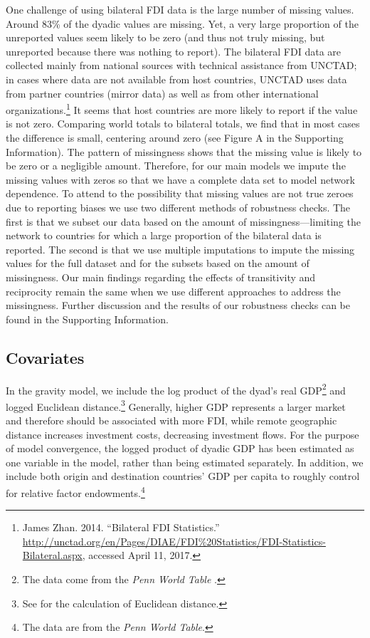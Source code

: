 \documentclass[reqno,onecolumn,letterpaper,12pt]{article}
\begin{document}
One challenge of using bilateral FDI data is the large number of missing values. %
Around 83\% of the dyadic values are missing. %
Yet, a very large proportion of the unreported values seem likely to be zero (and thus not truly missing, but unreported because there was nothing to report). The bilateral FDI data are collected mainly from national sources with technical assistance from UNCTAD; in cases where data are not available from host countries, UNCTAD uses data from partner countries (mirror data) as well as from other international organizations.\footnote{James Zhan. 2014. ``Bilateral FDI Statistics.'' \url{http://unctad.org/en/Pages/DIAE/FDI\%20Statistics/FDI-Statistics-Bilateral.aspx}, accessed April 11, 2017.}
It seems that host countries are more likely to report if the value is not zero. Comparing world totals to bilateral totals, we find that in most cases the difference is small, centering around zero (see Figure A in the Supporting Information). The pattern of missingness shows that the missing value is likely to be zero or a negligible amount. Therefore, for our main models we impute the missing values with zeros so that we have a complete data set to model network dependence. To attend to the possibility that missing values are not true zeroes due to reporting biases we use two different methods of robustness checks. The first is that we subset our data based on the amount of missingness---limiting the network to countries for which a large proportion of the bilateral data is reported. The second is that we use multiple imputations to impute the missing values for the full dataset and for the subsets based on the amount of missingness. Our main findings regarding the effects of transitivity and reciprocity remain the same when we use different approaches to address the missingness. Further discussion and the results of our robustness checks can be found in the Supporting Information.




\subsection{Covariates}

In the gravity model, we include the log product of the dyad's real GDP\footnote{The data come from the \textit{Penn World Table}  \citep{feenstra2015next}.} and logged Euclidean distance.\footnote{See \citet{mayer2011notes} for the calculation of Euclidean distance.} Generally, higher GDP represents a larger market and therefore should be associated with more FDI, while remote geographic distance increases investment costs, decreasing investment flows. For the purpose of model convergence, the logged product of dyadic GDP has been estimated as one variable in the model, rather than being estimated separately. In addition, we include both origin and destination countries' GDP per capita to roughly control for relative factor endowments.\footnote{The data are from the \textit{Penn World Table}.}
\end{document}
